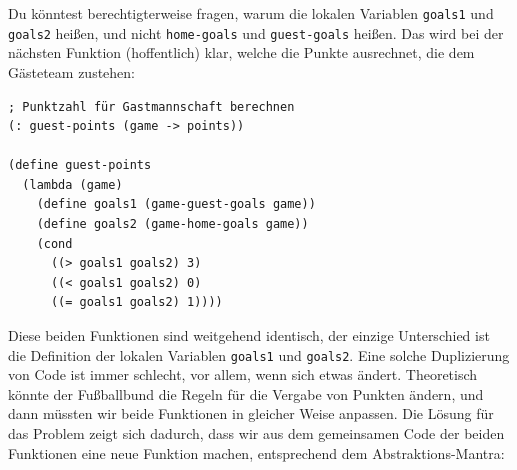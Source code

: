 %
Du könntest berechtigterweise fragen, warum die lokalen Variablen
\lstinline{goals1} und \lstinline{goals2} heißen, und nicht
\lstinline{home-goals} und \lstinline{guest-goals} heißen.  Das wird
bei der nächsten Funktion (hoffentlich) klar, welche die Punkte
ausrechnet, die dem Gästeteam zustehen:
%
\begin{lstlisting}
; Punktzahl für Gastmannschaft berechnen
(: guest-points (game -> points))

(define guest-points
  (lambda (game)
    (define goals1 (game-guest-goals game))
    (define goals2 (game-home-goals game))
    (cond
      ((> goals1 goals2) 3)
      ((< goals1 goals2) 0)
      ((= goals1 goals2) 1))))
\end{lstlisting}
%
Diese beiden Funktionen sind weitgehend identisch, der einzige
Unterschied ist die Definition der lokalen Variablen
\lstinline{goals1} und \lstinline{goals2}. Eine solche Duplizierung
von Code ist immer schlecht, vor allem, wenn sich etwas
ändert. Theoretisch könnte der Fußballbund die Regeln für die Vergabe
von Punkten ändern, und dann müssten wir beide Funktionen in
gleicher Weise anpassen.  Die Lösung für das Problem zeigt sich
dadurch, dass wir aus dem gemeinsamen Code der beiden Funktionen
eine neue Funktion machen, entsprechend dem Abstraktions-Mantra:

\mantraabstraktion*

